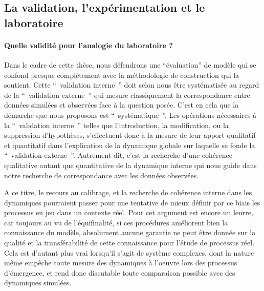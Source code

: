 
\subsection{La validation, l'expérimentation et le laboratoire}

\paragraph{Quelle validité pour l'analogie du laboratoire ?}

Dans le cadre de cette thèse, nous défendrons une \enquote{évaluation} de modèle qui se confond presque complètement avec la méthodologie de construction qui la soutient. Cette \enquote{ validation interne } doit selon nous être systématisée au regard de la \enquote{ validation externe } qui mesure classiquement la correspondance entre données simulées et observées face à la question posée. C’est en cela que la démarche que nous proposons est \enquote{ systématique }. Les opérations nécessaires à la \enquote{ validation interne } telles que l'introduction, la modification, ou la suppression d'hypothèses, s’effectuent donc à la mesure de leur apport qualitatif et quantitatif dans l'explication de la dynamique globale sur laquelle se fonde la \enquote{ validation externe }. Autrement dit, c'est la recherche d'une cohérence qualitative autant que quantitative de la dynamique interne qui nous guide dans notre recherche de correspondance avec les données observées.

A ce titre, le recours au calibrage, et la recherche de cohérence interne dans les dynamiques pourraient passer pour une tentative de mieux définir par ce biais les processus en jeu dans un contexte réel. Pour \autocite{OSullivan2004} cet argument est encore un leurre, car toujours au vu de l'équifinalité, si ces procédures améliorent bien la connaissance du modèle, absolument aucune garantie ne peut être donnée sur la qualité et la transférabilité de cette connaissance pour l'étude de processus réel. Cela est d'autant plus vrai lorsqu'il s'agit de système complexes, dont la nature même empêche toute  mesure des dynamiques à l'oeuvre lors des processus d'émergence, et rend donc discutable toute comparaison possible avec des dynamiques simulées.

